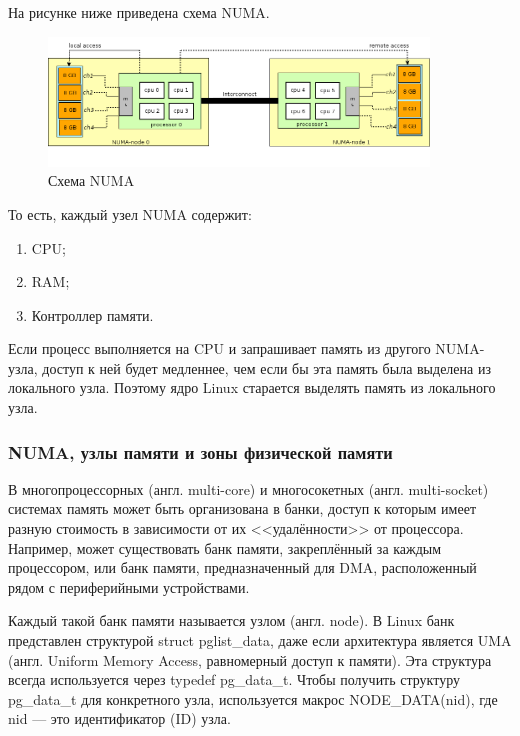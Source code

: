 На рисунке ниже приведена схема NUMA.

\begin{figure}[H]
	\centering
	\includegraphics[width=0.9\textwidth]{img/NUMA.png}
	\caption{Схема NUMA}
	\label{fig:numa}
\end{figure}

То есть, каждый узел NUMA содержит:
\begin{enumerate}
    \item CPU;
    \item RAM;
    \item Контроллер памяти.
\end{enumerate}

Если процесс выполняется на CPU и запрашивает память из другого NUMA-узла, доступ к ней будет медленнее, чем если бы эта память была выделена из локального узла.
Поэтому ядро Linux старается выделять память из локального узла.


\subsubsection{NUMA, узлы памяти и зоны физической памяти}

В многопроцессорных (англ. multi-core) и многосокетных (англ. multi-socket) системах память может быть организована в банки, доступ к которым имеет разную стоимость в зависимости от их <<удалённости>> от процессора.
Например, может существовать банк памяти, закреплённый за каждым процессором, или банк памяти, предназначенный для DMA, расположенный рядом с периферийными устройствами.

Каждый такой банк памяти называется узлом (англ. node).
В Linux банк представлен структурой {struct pglist\_data}, даже если архитектура является UMA (англ. Uniform Memory Access, равномерный доступ к памяти).
Эта структура всегда используется через {typedef pg\_data\_t}.
Чтобы получить структуру {pg\_data\_t} для конкретного узла, используется макрос {NODE\_DATA(nid)}, где {nid} — это идентификатор (ID) узла.

